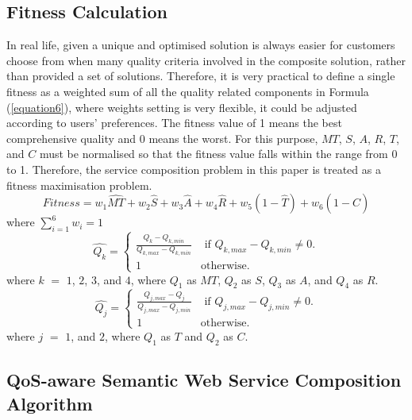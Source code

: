 \documentclass{IEEEtran}
\begin{document}
\subsection{Fitness Calculation}
In real life, given a unique and optimised solution is always easier for customers choose from when many quality criteria involved in the composite solution, rather than provided a set of solutions. Therefore, it is very practical to define a single fitness as a weighted sum of all the quality related components in Formula (\ref{equation6}), where weights setting is very flexible, it could be adjusted according to users' preferences. The fitness value of 1 means the best comprehensive quality and 0 means the worst. For this purpose, $MT$, $S$, $A$, $R$, $T$, and $C$ must be normalised so that the fitness value falls within the range from 0 to 1. Therefore, the service composition problem in this paper is treated as a fitness maximisation problem.
\vspace{-0.2cm}
\begin{equation}
\label{equation6}
Fitness = w_1 \hat{MT} + w_2 \hat{S} + w_3 \hat{A} + w_4 \hat{R} + w_5(1 - \hat{T}) + w_6(1 - \hat{C})
\end{equation}
\noindent where $\sum_{i=1}^{6} w_i = 1$
\\
\vspace{-0.2cm}
\begin{equation}
\label{equation7}
\hat{Q_k} = 
\begin{cases}
	\frac{Q_k - Q_{k, min}}{Q_{k, max} - Q_{k, min}} & \text{ if }Q_{k, max} - Q_{k, min} \neq 0.\\
	1 & \mathrm{ otherwise}.
\end{cases}
\end{equation}
\noindent where $k$ $=$ $1$, $2$, $3$, and $4$, where $Q_1$ as $MT$, $Q_2$ as $S$, $Q_3$ as $A$, and $Q_4$ as $R$.
\begin{equation}
\label{equation8}
\hat{Q_j} = 
\begin{cases}
	\frac{Q_{j,max} - Q_j}{Q_{j, max} - Q_{j, min}} & \text{ if }Q_{j, max} - Q_{j, min} \neq 0.\\
	1 & \mathrm{ otherwise}.
\end{cases}
\end{equation}
\noindent where $j$ $=$ $1$, and $2$, where $Q_1$ as $T$ and $Q_2$ as $C$.


\subsection{QoS-aware Semantic Web Service Composition Algorithm} \label{pso_algorithm}
\end{document}
